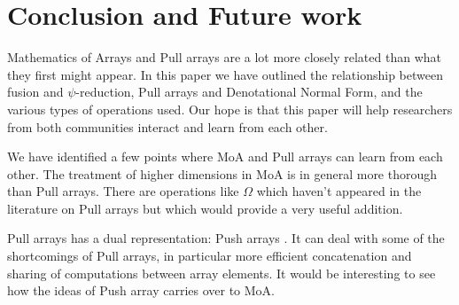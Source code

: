 \documentclass[preprint]{sigplanconf}
\begin{document}
\section{Conclusion and Future work}

Mathematics of Arrays and Pull arrays are a lot more closely related
than what they first might appear. In this paper we have outlined the
relationship between fusion and \(\psi\)-reduction, Pull arrays and
Denotational Normal Form, and the various types of operations used.
Our hope is that this paper will help researchers from both
communities interact and learn from each other.

We have identified a few points where MoA and Pull arrays can learn
from each other. The treatment of higher dimensions in MoA is in
general more thorough than Pull arrays. There are operations like
$\Omega$ which haven't appeared in the literature on Pull arrays but
which would provide a very useful addition.

Pull arrays has a dual representation: Push arrays
\cite{Claessen:2012:Expressive}. It can deal with some of the
shortcomings of Pull arrays, in particular more efficient
concatenation and sharing of computations between array elements. It
would be interesting to see how the ideas of Push array carries over
to MoA.










\end{document}
